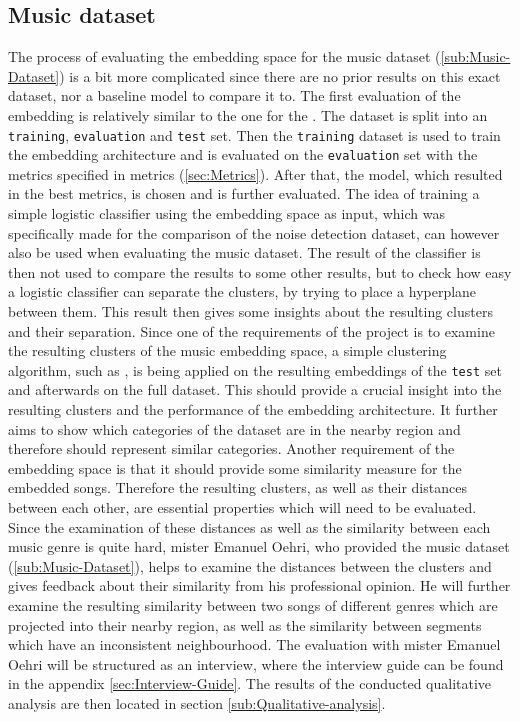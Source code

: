 \subsection{Music dataset}
\label{sub:Eval-Music}
The process of evaluating the embedding space for the music dataset (\ref{sub:Music-Dataset}) is a bit more complicated since there are no prior results on this exact dataset, nor a baseline model to compare it to. The first evaluation of the embedding is relatively similar to the one for the . The dataset is split into an \texttt{training}, \texttt{evaluation} and \texttt{test} set. Then the \texttt{training} dataset is used to train the embedding architecture and is evaluated on the \texttt{evaluation} set with the metrics specified in metrics (\ref{sec:Metrics}). After that, the model, which resulted in the best metrics, is chosen and is further evaluated.
\newline
\newline
The idea of training a simple logistic classifier using the embedding space as input, which was specifically made for the comparison of the noise detection dataset, can however also be used when evaluating the music dataset. The result of the classifier is then not used to compare the results to some other results, but to check how easy a logistic classifier can separate the clusters, by trying to place a hyperplane between them. This result then gives some insights about the resulting clusters and their separation.
\newline
\newline
Since one of the requirements of the project is to examine the resulting clusters of the music embedding space, a simple clustering algorithm, such as , is being applied on the resulting embeddings of the \texttt{test} set and afterwards on the full dataset. This should provide a crucial insight into the resulting clusters and the performance of the embedding architecture. It further aims to show which categories of the dataset are in the nearby region and therefore should represent similar categories. 
\newline
\newline
Another requirement of the embedding space is that it should provide some similarity measure for the embedded songs. Therefore the resulting clusters, as well as their distances between each other, are essential properties which will need to be evaluated. Since the examination of these distances as well as the similarity between each music genre is quite hard, mister Emanuel Oehri, who provided the music dataset (\ref{sub:Music-Dataset}), helps to examine the distances between the clusters and gives feedback about their similarity from his professional opinion. He will further examine the resulting similarity between two songs of different genres which are projected into their nearby region, as well as the similarity between segments which have an inconsistent neighbourhood. The evaluation with mister Emanuel Oehri will be structured as an interview, where the interview guide can be found in the appendix \ref{sec:Interview-Guide}. The results of the conducted qualitative analysis are then located in section \ref{sub:Qualitative-analysis}.

